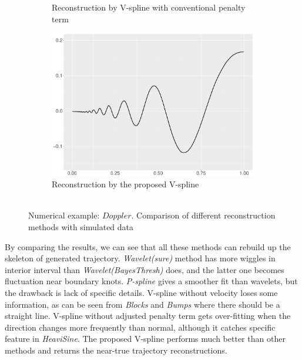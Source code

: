 \begin{figure}
\begin{subfigure}{0.45\textwidth}
    \caption{Reconstruction by V-spline with conventional penalty term}
    \end{subfigure}
    \begin{subfigure}{0.45\textwidth}
    \centering
    \includegraphics[width=\linewidth,height=0.45\textwidth]{Chapters/02TractorSplineTheory/plot/ggplot/ggDopplerTractor.pdf}
    \caption{Reconstruction by the proposed V-spline\\\mbox{  } }
    \end{subfigure}
\caption{Numerical example: $\textit{Doppler}$. Comparison of different reconstruction methods with simulated data}\label{num4}
 \end{figure}

By comparing the results, we can see that all these methods can rebuild up the skeleton of generated trajectory. \textit{Wavelet(sure)} method has more wiggles in interior interval than \textit{Wavelet(BayesThresh)} does, and the latter one becomes fluctuation near boundary knots. \textit{P-spline} gives a smoother fit than wavelets, but the drawback is lack of specific details. V-spline without velocity loses some information, as can be seen from \textit{Blocks} and \textit{Bumps} where there should be a straight line. V-spline without adjusted penalty term gets over-fitting when the direction changes more frequently than normal, although it catches specific feature in \textit{HeaviSine}. The proposed V-spline performs much better than other methods and returns the near-true trajectory reconstructions.  


